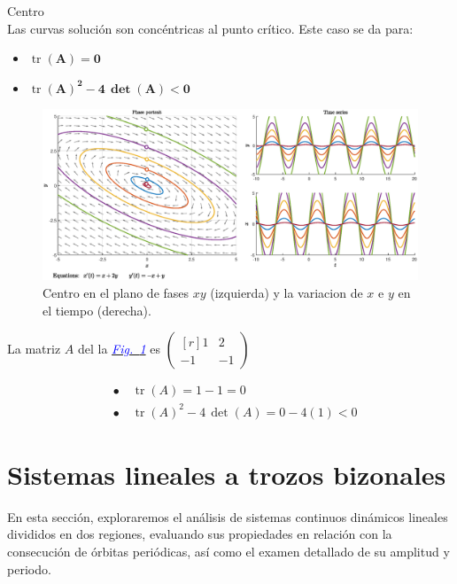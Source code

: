 \documentclass[12pt,a4paper]{report} %
\newcommand{\fref}[1]{\hyperref[#1]{\textcolor{blue}{\textit{Fig.~\ref*{#1}}}}}
\newcommand{\tr}{\operatorname{\textrm{tr}}}
\begin{document}
	\newpage
	
    {\Large\textbullet\quad Centro}\\[0.5cm]
    
    Las curvas solución son concéntricas al punto crítico. Este caso se da para: 
    \begin{itemize}
    	\item \textbf{$\tr$}$\bm{(A)=0}$
    	\item \textbf{$\tr$}$\bm{(A)^2-4\, \det(A)<0}$
    \end{itemize}
    
    \begin{figure}[h]
    	\centering
    	\includegraphics[width=1\textwidth]{centro.eps}
    	\caption{Centro en el plano de fases $xy$ (izquierda) y la variacion de $x$ e $y$ en el tiempo (derecha).}
    	\label{fig:centro}
    \end{figure}\smallskip
    
    La matriz $A$ del la \fref{fig:centro} es 
    $\begin{pmatrix*}[r]
    	1 & 2 \\
    	-1 & -1
    \end{pmatrix*}$
    
    \begin{align*}
    	&\bullet\quad \tr(A)=1-1=0 \\[2mm]
    	&\bullet\quad \tr(A)^2-4\, \det(A)=0-4(1)<0
    \end{align*}
	
	\newpage
	\section{Sistemas lineales a trozos bizonales}
	\label{sistrobiz}
	En esta sección, exploraremos el análisis de sistemas continuos dinámicos lineales divididos en dos regiones, evaluando sus propiedades en relación con la consecución de órbitas periódicas, así como el examen detallado de su amplitud y periodo.
	
\end{document}
